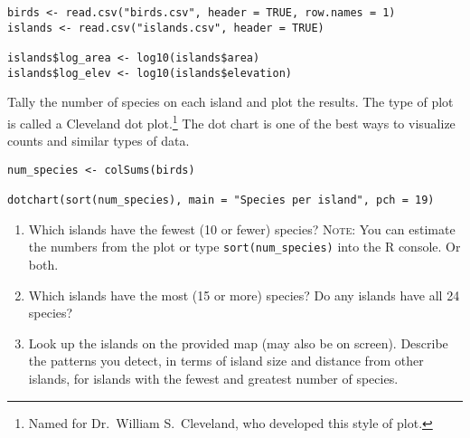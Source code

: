 \documentclass[11pt]{article}
\newcommand{\bigSpace}{\vspace{4\baselineskip}}
\begin{document}
{%
\begin{verbatim}
birds <- read.csv("birds.csv", header = TRUE, row.names = 1)
islands <- read.csv("islands.csv", header = TRUE)

islands$log_area <- log10(islands$area)
islands$log_elev <- log10(islands$elevation)
\end{verbatim}
}

\medskip


\vspace{\baselineskip}


Tally the number of species on each island and plot the results. The  type of plot is called a Cleveland dot plot.\footnote{Named for Dr.~William S.~Cleveland, who developed this style of plot.} The dot chart is one of the best ways to visualize counts and similar types of data.

{%
\begin{verbatim}
num_species <- colSums(birds) 

dotchart(sort(num_species), main = "Species per island", pch = 19)
\end{verbatim}
}

\newpage

\begin{enumerate}[resume]
\item Which islands have the fewest (10 or fewer) species? \textsc{Note:} You can estimate the numbers from the plot or type \texttt{sort(num\_species)} into the R console. Or both.

\bigSpace

\item Which islands have the most (15 or more) species? Do any islands have all 24 species?

\bigSpace

\item Look up the islands on the provided map (may also be on screen). Describe the patterns you detect, in terms of island size and distance from other islands, for islands with the fewest and greatest number of species.


\bigSpace

\end{enumerate}
\end{document}

